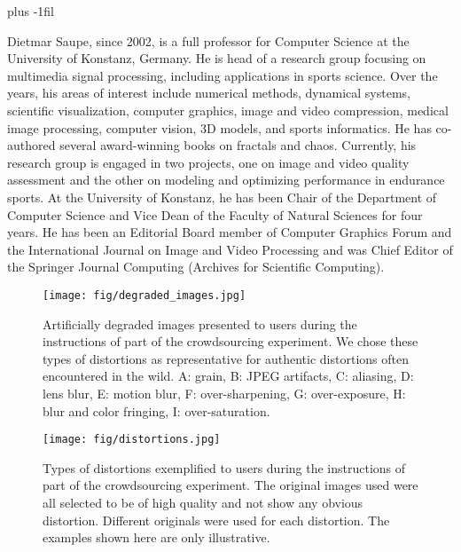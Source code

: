 \documentclass[10pt,journal,compsoc]{IEEEtran}
\begin{document}
\vskip 0pt plus -1fil
\begin{IEEEbiography}{Dietmar Saupe,} since 2002, is a full professor for Computer Science at the University of Konstanz, Germany. He is head of a research group focusing on multimedia signal processing, including applications in sports science. Over the years, his areas of interest include numerical methods, dynamical systems, scientific visualization, computer graphics, image and video compression, medical image processing, computer vision, 3D models, and sports informatics. He has co-authored several award-winning books on fractals and chaos. Currently, his research group is engaged in two projects, one on image and video quality assessment and the other on modeling and optimizing performance in endurance sports. At the University of Konstanz, he has been Chair of the Department of Computer Science and Vice Dean of the Faculty of Natural Sciences for four years. He has been an Editorial Board member of Computer Graphics Forum and the International Journal on Image and Video Processing and was Chief Editor of the Springer Journal Computing (Archives for Scientific Computing).
\end{IEEEbiography}











\newif\ifsupplementary
\ifsupplementary

\begin{figure*}[!htb]
\centering
\texttt{[image: fig/degraded\_images.jpg]}
\caption{Artificially degraded images presented to users during the instructions of part of the crowdsourcing experiment. We chose these types of distortions as representative for authentic distortions often encountered in the wild. A: grain, B: JPEG artifacts, C: aliasing, D: lens blur, E: motion blur, F: over-sharpening, G: over-exposure, H: blur and color fringing, I: over-saturation.}
\label{fig:degraded_images}
\end{figure*}















\begin{figure*}[!ht]
\centering
\texttt{[image: fig/distortions.jpg]}
\caption{Types of distortions exemplified to users during the instructions of part of the crowdsourcing experiment. The original images used were all selected to be of high quality and not show any obvious distortion. Different originals were used for each distortion. The examples shown here are only illustrative.}
\label{fig:distortions}
\end{figure*}
\end{document}
